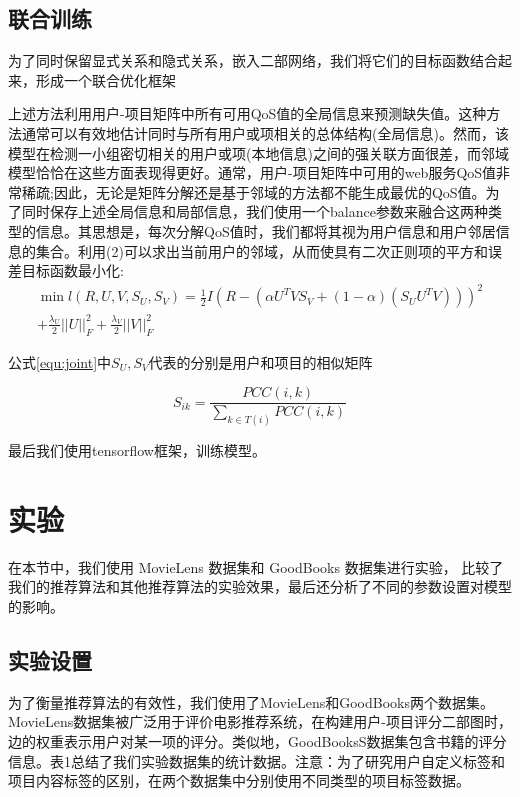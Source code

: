 \documentclass[lang=cn,11pt]{elegantpaper}
\begin{document}
\subsection{联合训练}
为了同时保留显式关系和隐式关系，嵌入二部网络，我们将它们的目标函数结合起来，形成一个联合优化框架

上述方法利用用户-项目矩阵中所有可用QoS值的全局信息来预测缺失值。这种方法通常可以有效地估计同时与所有用户或项相关的总体结构(全局信息)。然而，该模型在检测一小组密切相关的用户或项(本地信息)之间的强关联方面很差，而邻域模型恰恰在这些方面表现得更好。通常，用户-项目矩阵中可用的web服务QoS值非常稀疏;因此，无论是矩阵分解还是基于邻域的方法都不能生成最优的QoS值。为了同时保存上述全局信息和局部信息，我们使用一个balance参数来融合这两种类型的信息。其思想是，每次分解QoS值时，我们都将其视为用户信息和用户邻居信息的集合。利用(2)可以求出当前用户的邻域，从而使具有二次正则项的平方和误差目标函数最小化:
\begin{equation} \label{equ:joint}
\begin{array}{c}
\min l(R,U,V,{S_U},{S_V}) = \frac{1}{2}I{(R - (\alpha  {U^T}V{S_V} +  (1 - \alpha )({S_U} {U^T}V) ))^2}\\
+ \frac{{{\lambda _U}}}{2}||U||_F^2 + \frac{{{\lambda _V}}}{2}||V||_F^2
\end{array}
\end{equation}

公式\ref{equ:joint}中${S_U},{S_V}$代表的分别是用户和项目的相似矩阵

\begin{equation}
S_{ik} = \frac{PCC(i,k)}{\sum_{k \in T(i)} PCC(i,k)}
\end{equation}

最后我们使用tensorflow框架，训练模型。

\section{实验}

在本节中，我们使用 MovieLens 数据集和 GoodBooks 数据集进行实验，
比较了我们的推荐算法和其他推荐算法的实验效果，最后还分析了不同的参数设置对模型的影响。

\subsection{实验设置}
为了衡量推荐算法的有效性，我们使用了MovieLens和GoodBooks两个数据集。MovieLens数据集被广泛用于评价电影推荐系统\cite{He2017}，在构建用户-项目评分二部图时，边的权重表示用户对某一项的评分。类似地，GoodBooksS数据集包含书籍的评分信息。表1总结了我们实验数据集的统计数据。注意：为了研究用户自定义标签和项目内容标签的区别，在两个数据集中分别使用不同类型的项目标签数据。
\end{document}
